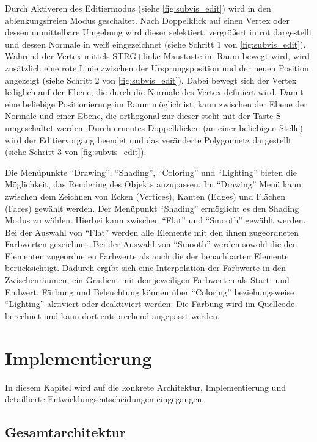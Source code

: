 Durch Aktiveren des Editiermodus (siehe \autoref{fig:subvis_edit}) wird in den ablenkungsfreien Modus geschaltet.
Nach Doppelklick auf einen Vertex oder dessen unmittelbare Umgebung wird dieser selektiert, vergrößert in rot dargestellt und dessen Normale in weiß eingezeichnet (siehe Schritt 1 von \autoref{fig:subvis_edit}).
Während der Vertex mittels STRG+linke Maustaste im Raum bewegt wird, wird zusätzlich eine rote Linie zwischen der Ursprungsposition und der neuen Position angezeigt (siehe Schritt 2 von \autoref{fig:subvis_edit}).
Dabei bewegt sich der Vertex lediglich auf der Ebene, die durch die Normale des Vertex definiert wird.
Damit eine beliebige Positionierung im Raum möglich ist, kann zwischen der Ebene der Normale und einer Ebene, die orthogonal zur dieser steht mit der Taste S umgeschaltet werden.
Durch erneutes Doppelklicken (an einer beliebigen Stelle) wird der Editiervorgang beendet und das veränderte Polygonnetz dargestellt (siehe Schritt 3 von \autoref{fig:subvis_edit}).

Die Menüpunkte \enquote{Drawing}, \enquote{Shading}, \enquote{Coloring} und \enquote{Lighting} bieten die Möglichkeit, das Rendering des Objekts anzupassen. Im \enquote{Drawing} Menü kann zwischen dem Zeichnen von Ecken (Vertices), Kanten (Edges) und Flächen (Faces) gewählt werden. Der Menüpunkt \enquote{Shading} ermöglicht es den Shading Modus zu wählen. Hierbei kann zwischen \enquote{Flat} und \enquote{Smooth} gewählt werden. Bei der Auswahl von \enquote{Flat} werden alle Elemente mit den ihnen zugeordneten Farbwerten gezeichnet. Bei der Auswahl von \enquote{Smooth} werden sowohl die den Elementen zugeordneten Farbwerte als auch die der benachbarten Elemente berücksichtigt. Dadurch ergibt sich eine Interpolation der Farbwerte in den Zwischenräumen, ein Gradient mit den jeweiligen Farbwerten als Start- und Endwert. Färbung und Beleuchtung können über \enquote{Coloring} beziehungsweise \enquote{Lighting} aktiviert oder deaktiviert werden. Die Färbung wird im Quellcode berechnet und kann dort entsprechend angepasst werden.


\section{Implementierung}

In diesem Kapitel wird auf die konkrete Architektur, Implementierung und detaillierte Entwicklungsentscheidungen eingegangen.

\subsection{Gesamtarchitektur}


